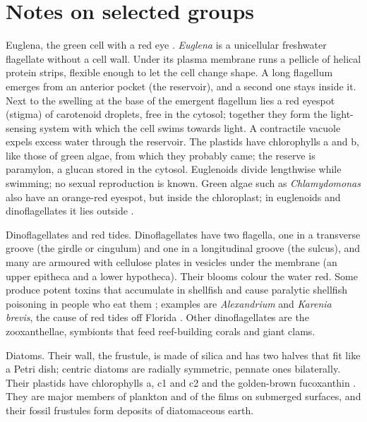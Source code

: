 \section{Notes on selected groups}
\label{section-selected-groups}

Euglena, the green cell with a red eye
\cite[Chapter 15]{evert2013raven}.
\emph{Euglena} is a unicellular freshwater
flagellate without a cell wall. Under its
plasma membrane runs a pellicle of helical
protein strips, flexible enough to let the
cell change shape. A long flagellum emerges
from an anterior pocket (the reservoir), and
a second one stays inside it. Next to the
swelling at the base of the emergent
flagellum lies a red eyespot (stigma) of
carotenoid droplets, free in the cytosol;
together they form the light-sensing system
with which the cell swims towards light. A
contractile vacuole expels excess water
through the reservoir. The plastids have
chlorophylls a and b, like those of green
algae, from which they probably came; the
reserve is paramylon, a glucan stored in the
cytosol. Euglenoids divide lengthwise while
swimming; no sexual reproduction is known.
Green algae such as \emph{Chlamydomonas} also
have an orange-red eyespot, but inside the
chloroplast; in euglenoids and
dinoflagellates it lies outside \cite[Chapter
1]{lee2008phycology}.

Dinoflagellates and red tides.
Dinoflagellates have two flagella, one in a
transverse groove (the girdle or cingulum)
and one in a longitudinal groove (the
sulcus), and many are armoured with cellulose
plates in vesicles under the membrane (an
upper epitheca and a lower hypotheca). Their
blooms colour the water red. Some produce
potent toxins that accumulate in shellfish
and cause paralytic shellfish poisoning in
people who eat them \cite[Chapter
7]{lee2008phycology}; examples are
\emph{Alexandrium} \cite[Chapter
12]{tortora2013microbiology} and
\emph{Karenia brevis}, the cause of red tides
off Florida \cite[Chapter
15]{evert2013raven}. Other dinoflagellates
are the zooxanthellae, symbionts that feed
reef-building corals and giant clams.

Diatoms. Their wall, the frustule, is made of
silica and has two halves that fit like a
Petri dish; centric diatoms are radially
symmetric, pennate ones bilaterally. Their
plastids have chlorophylls a, c1 and c2 and
the golden-brown fucoxanthin \cite[Chapter
17]{lee2008phycology}. They are major members
of plankton and of the films on submerged
surfaces, and their fossil frustules form
deposits of diatomaceous earth.

